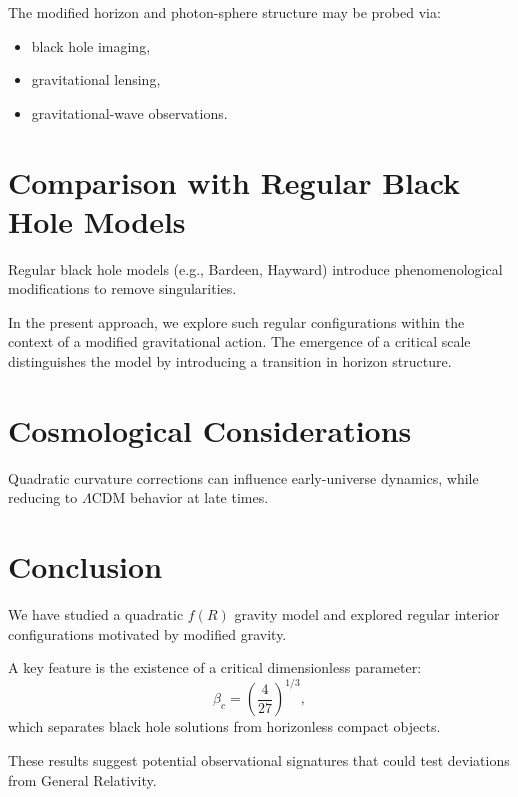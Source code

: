 \documentclass[11pt,a4paper]{article}
\begin{document}
The modified horizon and photon-sphere structure may be probed via:
\begin{itemize}
\item black hole imaging,
\item gravitational lensing,
\item gravitational-wave observations.
\end{itemize}

\section{Comparison with Regular Black Hole Models}

Regular black hole models (e.g., Bardeen, Hayward) introduce phenomenological modifications to remove singularities.

In the present approach, we explore such regular configurations within the context of a modified gravitational action. The emergence of a critical scale distinguishes the model by introducing a transition in horizon structure.

\section{Cosmological Considerations}

Quadratic curvature corrections can influence early-universe dynamics, while reducing to $\Lambda$CDM behavior at late times.

\section{Conclusion}

We have studied a quadratic $f(R)$ gravity model and explored regular interior configurations motivated by modified gravity.

A key feature is the existence of a critical dimensionless parameter:
\begin{equation}
\beta_c = \left(\frac{4}{27}\right)^{1/3},
\end{equation}
which separates black hole solutions from horizonless compact objects.

These results suggest potential observational signatures that could test deviations from General Relativity.



\end{document}
